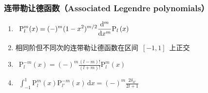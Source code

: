 \documentclass[12pt,a4paper]{article}
\newcommand\dif{\mathrm{d}}
\newcommand\diff{\,\mathrm{d}}
\renewcommand{\[}{\ $\displaystyle}
\renewcommand{\]}{$\ }%
\begin{document}
	  \subsubsection{连带勒让德函数（Associated Legendre polynomials）}
	    \begin{enumerate}
	    	\item \[
	    		  \mathrm{P}_l^m(x) = (-)^m (1-x^2)^{m/2}\frac{\dif ^m}{\dif x^m}\fp{x}
	    		\]
	    	\item 相同阶但不同次的连带勒让德函数在区间\[[-1,1]\]上正交
	    	\item \[\mathrm{P}_l^{-m}(x) = (-)^m\frac{(l-m)!}{(l+m)!}\mathrm{P}_l^m(x)\]
	    	\item \[
	    	\int_{-1}^1\mathrm{P}_l^m(x)\mathrm{P}_{l'}^{-m}(x)\diff x = (-)^m\frac{2\delta_{ll'}}{2l+1} \]
	    \end{enumerate}
	       
	      
\end{document}

